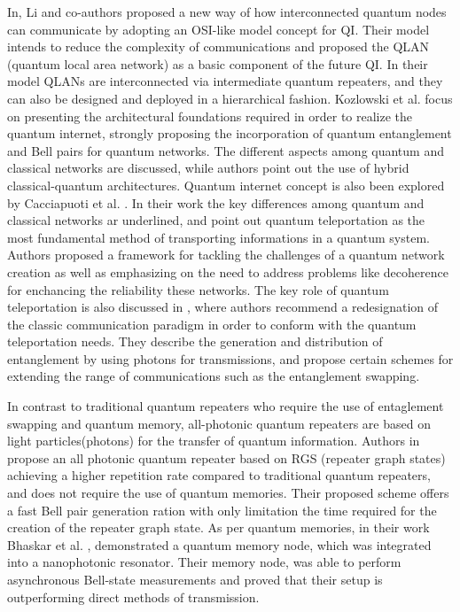 \documentclass[12pt,a4paper] {report}
\begin{document}
		In\cite{li-arch}, Li and co-authors proposed a new way of how interconnected
		quantum nodes can communicate by adopting an OSI-like
		model concept for QI. Their model intends to reduce the complexity of communications
		and proposed the QLAN (quantum local area network) as a basic component of the future QI. In their model
		QLANs are interconnected via intermediate quantum repeaters, and they can also be designed and deployed in
		a hierarchical fashion.
		Kozlowski et al. \cite{rfc} focus on presenting the architectural foundations required in order to
		realize the quantum internet, strongly proposing the incorporation of quantum entanglement and Bell pairs for quantum networks. 
		The different aspects among quantum and classical networks are discussed, while authors point out the use of hybrid
		classical-quantum architectures.		Quantum internet concept is also been explored by Cacciapuoti et al. \cite{net-chall-dqc}.
		In their work the key differences among quantum and classical
		networks ar underlined, and point out quantum teleportation as the most fundamental method of transporting 
		informations in a quantum system. Authors proposed a framework for tackling the challenges of a quantum
		network creation as well as emphasizing on the need to address problems like decoherence for enchancing the
		reliability these networks. The key role of quantum teleportation is also discussed in \cite{entagl-classic},
		where authors recommend a redesignation of the classic communication paradigm in order to conform with the quantum teleportation needs.
		They describe the generation and distribution of entanglement by using photons for transmissions, and propose certain schemes for extending
		the range of communications such as the entanglement swapping.

		In contrast to traditional quantum repeaters who require the use of entaglement swapping and quantum memory, all-photonic quantum repeaters
		are based on light particles(photons) for the transfer of quantum information.
		Authors in \cite{repeater1} propose an all photonic quantum repeater 
		based on RGS (repeater graph states) achieving a higher repetition rate compared to traditional quantum repeaters, and does not require 
		the use of quantum memories. Their proposed scheme offers a fast Bell pair generation ration with only
		limitation the time required for the creation of the repeater graph state. 
		As per quantum memories, in their work Bhaskar et al. \cite{memories}, demonstrated a quantum memory node, which
		was integrated into a nanophotonic resonator. Their memory node, was able to perform asynchronous Bell-state measurements
		and proved that their setup is outperforming direct methods of transmission.
		
\end{document}

